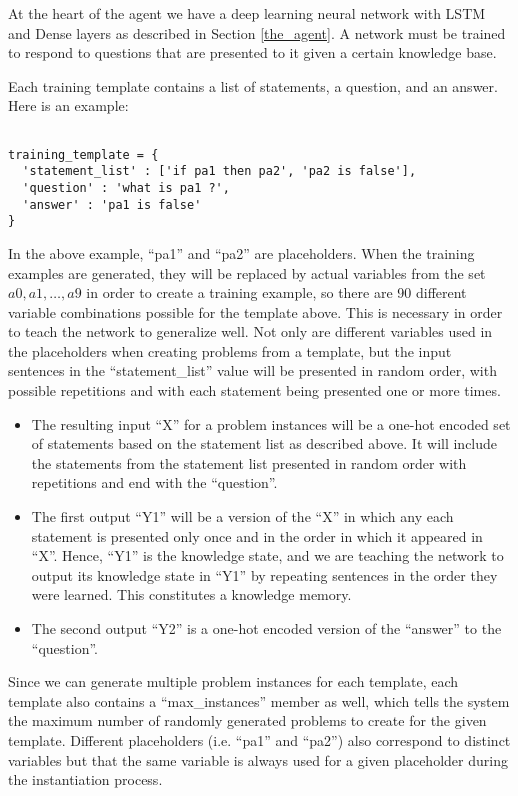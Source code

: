 \documentclass{article}
\begin{document}
At the heart of the agent we have a deep learning neural network with
LSTM and Dense layers as described in Section \ref{the_agent}.  A network
must be trained to respond to questions that are presented to it given a
certain knowledge base.

Each training template contains a list of statements, a question, and an
answer.  Here is an example:

\begin{verbatim}

training_template = {
  'statement_list' : ['if pa1 then pa2', 'pa2 is false'],
  'question' : 'what is pa1 ?',
  'answer' : 'pa1 is false'
}

\end{verbatim}

In the above example, ``pa1'' and ``pa2'' are placeholders.  When the
training examples are generated, they will be replaced by actual variables
from the set ${a0, a1, \ldots, a9}$ in order to create a training example, so
there are 90 different variable combinations possible for the template above.
This is necessary in order to teach the network to generalize well.  Not only
are different variables used in the placeholders when creating problems from
a template, but the input sentences in the ``statement\_list'' value will
be presented in random order, with possible repetitions and with each
statement being presented one or more times.

\begin{itemize}
\item The resulting input ``X'' for a problem instances will be a one-hot encoded
set of statements based on the statement list as described above.  It will
include the statements from the statement list presented in random order with
repetitions and end with the ``question''.
\item The first output ``Y1'' will be a version of the ``X'' in which any
each statement is presented only once and in the order in which it appeared
in ``X''.  Hence, ``Y1'' is the knowledge state, and we are teaching the
network to output its knowledge state in ``Y1'' by repeating sentences in
the order they were learned.  This constitutes a knowledge memory.
\item The second output ``Y2'' is a one-hot encoded version of the ``answer''
to the ``question''.
\end{itemize}

Since we can generate multiple problem instances for each template,
each template also contains a ``max\_instances'' member as well, which tells
the system the maximum number of randomly generated problems to create
for the given template.
Different placeholders (i.e. ``pa1'' and ``pa2'') also correspond to distinct
variables but that the same variable is always used for a given placeholder
during the instantiation process.
\end{document}
